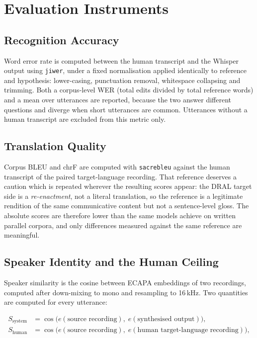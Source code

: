 \section{Evaluation Instruments}
\label{sec:instruments}

\subsection{Recognition Accuracy}
Word error rate is computed between the human transcript and the Whisper output using
\texttt{jiwer}, under a fixed normalisation applied identically to reference and hypothesis:
lower-casing, punctuation removal, whitespace collapsing and trimming. Both a corpus-level WER
(total edits divided by total reference words) and a mean over utterances are reported, because the
two answer different questions and diverge when short utterances are common. Utterances without a
human transcript are excluded from this metric only.

\subsection{Translation Quality}
Corpus BLEU \cite{papineni2002bleu} and chrF \cite{popovic2015chrf} are computed with
\texttt{sacrebleu} \cite{post2018sacrebleu} against the human transcript of the paired
target-language recording. That reference deserves a caution which is repeated wherever the
resulting scores appear: the DRAL target side is a \emph{re-enactment}, not a literal translation,
so the reference is a legitimate rendition of the same communicative content but not a
sentence-level gloss. The absolute scores are therefore lower than the same models achieve on
written parallel corpora, and only differences measured against the same reference are meaningful.

\subsection{Speaker Identity and the Human Ceiling}
\label{sec:identity_method}
Speaker similarity is the cosine between ECAPA embeddings of two recordings, computed after
down-mixing to mono and resampling to 16\,kHz. Two quantities are computed for every utterance:

\begin{align}
S_{\text{system}} &= \cos\!\big(e(\text{source recording}),\; e(\text{synthesised output})\big),
\label{eq:ssystem}\\[2pt]
S_{\text{human}}  &= \cos\!\big(e(\text{source recording}),\;
                                e(\text{human target-language recording})\big),
\label{eq:shuman}
\end{align}

